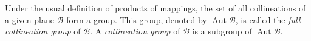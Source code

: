 Under the usual definition of products of mappings, the set of all collineations of a given plane $\mathcal{B}$ form a group. This group, denoted by $\operatorname{Aut}\mathcal{B}$, is called the \emph{full collineation group} of $\mathcal{B}$. A \emph{collineation group} of $\mathcal{B}$ is a subgroup of $\operatorname{Aut}\mathcal{B}$.
